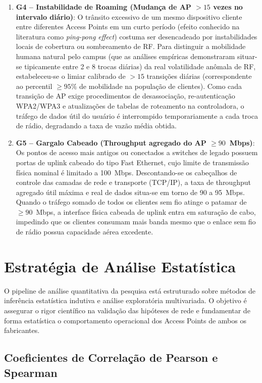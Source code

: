 \begin{enumerate}
    \item \textbf{G4 – Instabilidade de Roaming (Mudança de AP $> 15$ vezes no intervalo diário)}: O trânsito excessivo de um mesmo dispositivo cliente entre diferentes Access Points em um curto período (efeito conhecido na literatura como \textit{ping-pong effect}) \cite{gast2005} costuma ser desencadeado por instabilidades locais de cobertura ou sombreamento de RF. Para distinguir a mobilidade humana natural pelo campus (que as análises empíricas demonstraram situar-se tipicamente entre 2 e 8 trocas diárias) da real volatilidade anômala de RF, estabeleceu-se o limiar calibrado de $> 15$ transições diárias (correspondente ao percentil $\ge 95\%$ de mobilidade na população de clientes). Como cada transição de AP exige procedimentos de desassociação, re-autenticação WPA2/WPA3 e atualizações de tabelas de roteamento na controladora, o tráfego de dados útil do usuário é interrompido temporariamente a cada troca de rádio, degradando a taxa de vazão média obtida.
    
    \item \textbf{G5 – Gargalo Cabeado (Throughput agregado do AP $\ge 90$~Mbps)}: Os pontos de acesso mais antigos ou conectados a switches de legado possuem portas de uplink cabeado do tipo Fast Ethernet, cujo limite de transmissão física nominal é limitado a 100~Mbps. Descontando-se os cabeçalhos de controle das camadas de rede e transporte (TCP/IP), a taxa de throughput agregado útil máxima e real de dados situa-se em torno de 90 a 95~Mbps. Quando o tráfego somado de todos os clientes sem fio atinge o patamar de $\ge 90$~Mbps, a interface física cabeada de uplink entra em saturação de cabo, impedindo que os clientes consumam mais banda mesmo que o enlace sem fio de rádio possua capacidade aérea excedente.
\end{enumerate}

\section{Estratégia de Análise Estatística}
\label{sec:metodologia_estrategia}

O pipeline de análise quantitativa da pesquisa está estruturado sobre métodos de inferência estatística indutiva e análise exploratória multivariada. O objetivo é assegurar o rigor científico na validação das hipóteses de rede e fundamentar de forma estatística o comportamento operacional dos Access Points de ambos os fabricantes.

\subsection{Coeficientes de Correlação de Pearson e Spearman}
\label{subsec:metodologia_correlacao_teoria}

